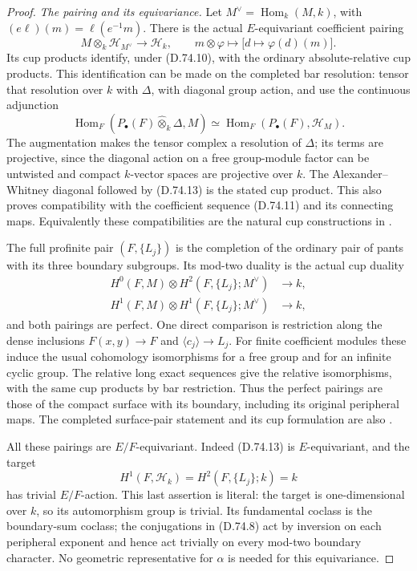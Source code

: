 \begin{proof}
\emph{The pairing and its equivariance.}
Let $M^\vee=\operatorname{Hom}_k(M,k)$, with
$(e\ell)(m)=\ell(e^{-1}m)$.  There is the actual
$E$-equivariant coefficient pairing
\[
 M\otimes_k\mathscr H_{M^\vee}\longrightarrow\mathscr H_k,
 \qquad
 m\otimes\varphi\longmapsto
                \bigl[d\longmapsto\varphi(d)(m)\bigr].
 \tag{D.74.13}
\]
Its cup products identify, under (D.74.10), with the
ordinary absolute-relative cup products.  This
identification can be made on the completed bar
resolution: tensor that resolution over $k$ with
$\Delta$, with diagonal group action, and use the
continuous adjunction
\[
 \operatorname{Hom}_F(P_\bullet(F)\widehat\otimes_k\Delta,M)
 \simeq
 \operatorname{Hom}_F(P_\bullet(F),\mathscr H_M).
 \tag{D.74.14}
\]
The augmentation makes the tensor complex a resolution
of $\Delta$; its terms are projective, since the diagonal
action on a free group-module factor can be untwisted
and compact $k$-vector spaces are projective over $k$.
The Alexander--Whitney diagonal followed by (D.74.13)
is the stated cup product.  This also proves compatibility
with the coefficient sequence (D.74.11) and its connecting
maps.  Equivalently these compatibilities are the
natural cup constructions in
\cite[Section~3, especially Propositions~3.1 and~3.5]
{C-WilkesRelativeAccepted2018}.

The full profinite pair $(F,\{L_j\})$ is the completion
of the ordinary pair of pants with its three boundary
subgroups.  Its mod-two duality is the actual cup
duality
\[
 \begin{split}
 H^0(F,M)\otimes H^2(F,\{L_j\};M^\vee)&\longrightarrow k,\\
 H^1(F,M)\otimes H^1(F,\{L_j\};M^\vee)&\longrightarrow k,
 \end{split}
 \tag{D.74.15}
\]
and both pairings are perfect.  One direct comparison
is restriction along the dense inclusions
$F(x,y)\to F$ and $\langle c_j\rangle\to L_j$.
For finite coefficient modules these induce the usual
cohomology isomorphisms for a free group and for an
infinite cyclic group.  The relative long exact
sequences give the relative isomorphisms, with the
same cup products by bar restriction.  Thus the
perfect pairings are those of the compact surface
with its boundary, including its original peripheral
maps.  The completed surface-pair statement and its
cup formulation are also
\cite[Proposition~6.16 and Proposition~5.7]
{C-WilkesRelativeAccepted2018}.

All these pairings are $E/F$-equivariant.  Indeed
(D.74.13) is $E$-equivariant, and the target
\[
 H^1(F,\mathscr H_k)
       =H^2(F,\{L_j\};k)=k
 \tag{D.74.16}
\]
has trivial $E/F$-action.  This last assertion is
literal: the target is one-dimensional over $k$,
so its automorphism group is trivial.  Its
fundamental coclass is the boundary-sum coclass;
the conjugations in (D.74.8) act by inversion on
each peripheral exponent and hence act trivially
on every mod-two boundary character.  No geometric
representative for $\alpha$ is needed for this
equivariance.


\end{proof}
